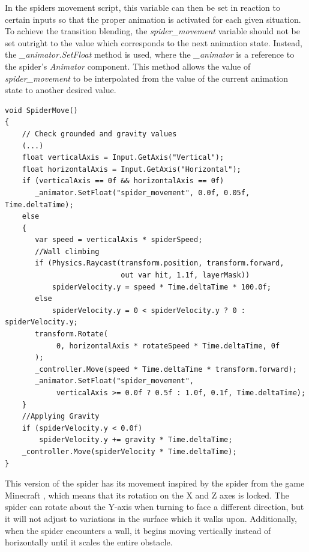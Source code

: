 In the spiders movement script, this variable can then be set in reaction to
certain inputs so that the proper animation is activated for each given situation.
To achieve the transition blending, the \textit{spider\_movement} variable
should not be set outright to the value which corresponds to the next animation
state. Instead, the \textit{\_animator.SetFloat} method is used, where the
\textit{\_animator} is a reference to the spider's \textit{Animator} component. This
method allows the value of \textit{spider\_movement} to be interpolated from the value of
the current animation state to another desired value.
\newline
\begin{lstlisting}[basicstyle=\linespread{0.9}\footnotesize\ttfamily, numbers=none,frame=single,
caption={Moving the baked version of the spider, and playing the appropriate
animations by setting the \textit{spider\_movement} variable using the
\textit{\_animator.SetFloat()} method.
\textit{BakedSpiderMovement.cs}},captionpos=b, label=set_float,
language={[Sharp]c}, float=tp]
void SpiderMove()
{
    // Check grounded and gravity values
    (...)
    float verticalAxis = Input.GetAxis("Vertical");
    float horizontalAxis = Input.GetAxis("Horizontal");
    if (verticalAxis == 0f && horizontalAxis == 0f)
       _animator.SetFloat("spider_movement", 0.0f, 0.05f, Time.deltaTime);
    else
    {
       var speed = verticalAxis * spiderSpeed;
       //Wall climbing
       if (Physics.Raycast(transform.position, transform.forward, 
                           out var hit, 1.1f, layerMask))
           spiderVelocity.y = speed * Time.deltaTime * 100.0f;
       else
           spiderVelocity.y = 0 < spiderVelocity.y ? 0 : spiderVelocity.y;
       transform.Rotate(
            0, horizontalAxis * rotateSpeed * Time.deltaTime, 0f
       );
       _controller.Move(speed * Time.deltaTime * transform.forward);
       _animator.SetFloat("spider_movement", 
            verticalAxis >= 0.0f ? 0.5f : 1.0f, 0.1f, Time.deltaTime);
    }
    //Applying Gravity
    if (spiderVelocity.y < 0.0f)
        spiderVelocity.y += gravity * Time.deltaTime;
    _controller.Move(spiderVelocity * Time.deltaTime);
}
\end{lstlisting}

This version of the spider has its movement inspired by the spider from the game
Minecraft \cite{minecraft}, which means that its rotation on the X and Z axes is locked. The
spider can rotate about the Y-axis when turning to face a different direction,
but it will not adjust to variations in the surface which it walks upon.
Additionally, when the spider encounters a wall, it begins moving
vertically instead of horizontally until it scales the entire obstacle.\\

